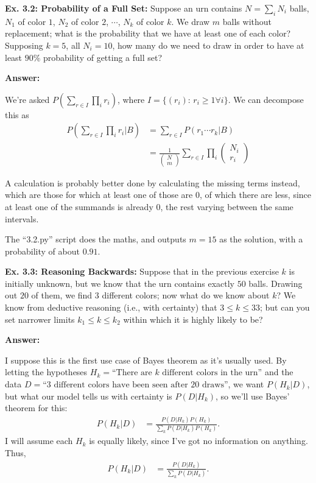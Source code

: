 \documentclass{article}
\begin{document}
\textbf{Ex. 3.2: Probability of a Full Set: }Suppose an urn contains $N=\sum_iN_i$ balls, $N_1$ of color $1$, $N_2$ of color $2$, $\cdots$, $N_k$ of color $k$. We draw $m$ balls without replacement; what is the probability that we have at least one of each color? Supposing $k=5$, all $N_i=10$, how many do we need to draw in order to have at least $90\%$ probability of getting a full set?

\textbf{Answer: }

We're asked $P\left(\sum_{r\in I}\prod_ir_i\right)$, where $I=\{(r_i):\,r_i\geq1\forall i\}$. We can decompose this as 
\begin{align}
	P\left(\sum_{r\in I}\prod_ir_i|B\right)&=\sum_{r\in I}P\left(r_1\cdots r_k|B\right)\\
	&=\frac1{\begin{pmatrix}N\\m\end{pmatrix}}\sum_{r\in I}\prod_i\begin{pmatrix}N_i\\r_i\end{pmatrix}
\end{align}

A calculation is probably better done by calculating the missing terms instead, which are those for which at least one of those are $0$, of which there are less, since at least one of the summands is already $0$, the rest varying between the same intervals.

The ``3.2.py'' script does the maths, and outputs $m=15$ as the solution, with a probability of about $0.91$.

\textbf{Ex. 3.3: Reasoning Backwards: }Suppose that in the previous exercise $k$ is initially unknown, but we know that the urn contains exactly $50$ balls. Drawing out $20$ of them, we find $3$ different colors; now what do we know about $k$? We know from deductive reasoning (i.e., with certainty) that $3\leq k\leq 33$; but can you set narrower limits $k_1\leq k\leq k_2$ within which it is highly likely to be?

\textbf{Answer:}

I suppose this is the first use case of Bayes theorem as it's usually used. By letting the hypotheses $H_k=\text{``There are $k$ different colors in the urn''}$ and the data $D=\text{``3 different colors have been seen after 20 draws''}$, we want $P(H_k|D)$, but what our model tells us with certainty is $P(D|H_k)$, so we'll use Bayes' theorem for this:
\begin{align}
	P(H_k|D)&=\frac{P(D|H_k)P(H_k)}{\sum_kP(D|H_k)P(H_k)}.
\end{align}
I will assume each $H_k$ is equally likely, since I've got no information on anything. Thus,
\begin{align}
	P(H_k|D)&=\frac{P(D|H_k)}{\sum_kP(D|H_k)}.
\end{align}
\end{document}
